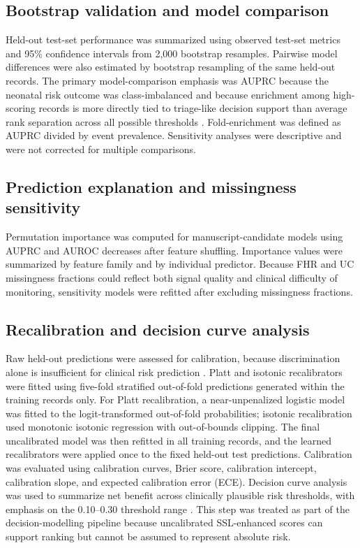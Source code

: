 \documentclass[utf8]{FrontiersinHarvard}
\begin{document}
\subsection{Bootstrap validation and model comparison}

Held-out test-set performance was summarized using observed test-set metrics and 95\% confidence intervals from 2,000 bootstrap resamples. Pairwise model differences were also estimated by bootstrap resampling of the same held-out records. The primary model-comparison emphasis was AUPRC because the neonatal risk outcome was class-imbalanced and because enrichment among high-scoring records is more directly tied to triage-like decision support than average rank separation across all possible thresholds \citep{davis2006,steyerberg2019}. Fold-enrichment was defined as AUPRC divided by event prevalence. Sensitivity analyses were descriptive and were not corrected for multiple comparisons.

\subsection{Prediction explanation and missingness sensitivity}

Permutation importance was computed for manuscript-candidate models using AUPRC and AUROC decreases after feature shuffling. Importance values were summarized by feature family and by individual predictor. Because FHR and UC missingness fractions could reflect both signal quality and clinical difficulty of monitoring, sensitivity models were refitted after excluding missingness fractions.

\subsection{Recalibration and decision curve analysis}

Raw held-out predictions were assessed for calibration, because discrimination alone is insufficient for clinical risk prediction \citep{vanCalster2019,steyerberg2019}. Platt and isotonic recalibrators were fitted using five-fold stratified out-of-fold predictions generated within the training records only. For Platt recalibration, a near-unpenalized logistic model was fitted to the logit-transformed out-of-fold probabilities; isotonic recalibration used monotonic isotonic regression with out-of-bounds clipping. The final uncalibrated model was then refitted in all training records, and the learned recalibrators were applied once to the fixed held-out test predictions. Calibration was evaluated using calibration curves, Brier score, calibration intercept, calibration slope, and expected calibration error (ECE). Decision curve analysis was used to summarize net benefit across clinically plausible risk thresholds, with emphasis on the 0.10--0.30 threshold range \citep{vickers2006}. This step was treated as part of the decision-modelling pipeline because uncalibrated SSL-enhanced scores can support ranking but cannot be assumed to represent absolute risk.
\end{document}
